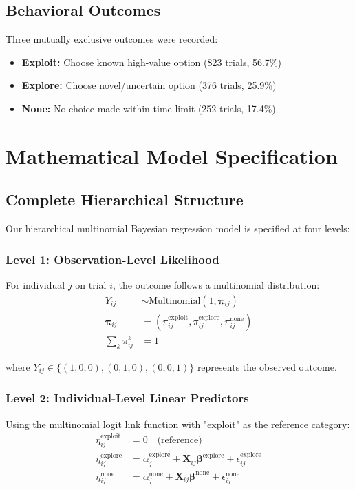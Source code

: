 \documentclass[11pt]{article}
\begin{document}
\subsection{Behavioral Outcomes}
Three mutually exclusive outcomes were recorded:
\begin{itemize}
    \item \textbf{Exploit:} Choose known high-value option (823 trials, 56.7\%)
    \item \textbf{Explore:} Choose novel/uncertain option (376 trials, 25.9\%)
    \item \textbf{None:} No choice made within time limit (252 trials, 17.4\%)
\end{itemize}

\section{Mathematical Model Specification}

\subsection{Complete Hierarchical Structure}

Our hierarchical multinomial Bayesian regression model is specified at four levels:

\subsubsection{Level 1: Observation-Level Likelihood}
For individual $j$ on trial $i$, the outcome follows a multinomial distribution:
\begin{align}
Y_{ij} &\sim \text{Multinomial}(1, \boldsymbol{\pi}_{ij}) \label{eq:likelihood}\\
\boldsymbol{\pi}_{ij} &= (\pi_{ij}^{\text{exploit}}, \pi_{ij}^{\text{explore}}, \pi_{ij}^{\text{none}}) \label{eq:probabilities}\\
\sum_{k} \pi_{ij}^{k} &= 1 \label{eq:constraint}
\end{align}

where $Y_{ij} \in \{(1,0,0), (0,1,0), (0,0,1)\}$ represents the observed outcome.

\subsubsection{Level 2: Individual-Level Linear Predictors}
Using the multinomial logit link function with "exploit" as the reference category:
\begin{align}
\eta_{ij}^{\text{exploit}} &= 0 \quad \text{(reference)} \label{eq:exploit_linear}\\
\eta_{ij}^{\text{explore}} &= \alpha_{j}^{\text{explore}} + \boldsymbol{X}_{ij} \boldsymbol{\beta}^{\text{explore}} + \epsilon_{ij}^{\text{explore}} \label{eq:explore_linear}\\
\eta_{ij}^{\text{none}} &= \alpha_{j}^{\text{none}} + \boldsymbol{X}_{ij} \boldsymbol{\beta}^{\text{none}} + \epsilon_{ij}^{\text{none}} \label{eq:none_linear}
\end{align}
\end{document}
